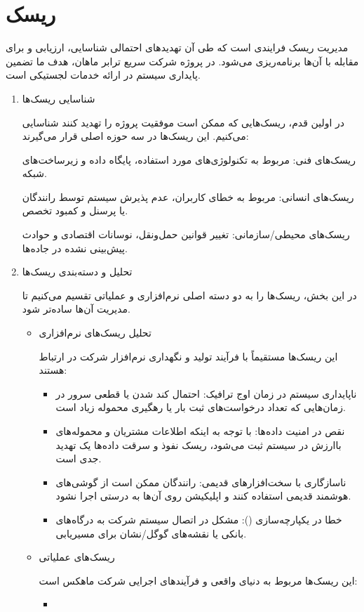 \documentclass[12pt,a4paper]{report}
\begin{document}
\chapter{ریسک}
مدیریت ریسک فرایندی است که طی آن تهدیدهای احتمالی شناسایی، ارزیابی و برای مقابله با آن‌ها برنامه‌ریزی می‌شود. در پروژه شرکت سریع ترابر ماهان، هدف ما تضمین پایداری سیستم در ارائه خدمات لجستیکی است.
\begin{enumerate}
	\item 
 شناسایی ریسک‌ها 
 
در اولین قدم، ریسک‌هایی که ممکن است موفقیت پروژه را تهدید کنند شناسایی می‌کنیم. این ریسک‌ها در سه حوزه اصلی قرار می‌گیرند:

ریسک‌های فنی: مربوط به تکنولوژی‌های مورد استفاده، پایگاه داده و زیرساخت‌های شبکه.

ریسک‌های انسانی: مربوط به خطای کاربران، عدم پذیرش سیستم توسط رانندگان یا پرسنل و کمبود تخصص.

ریسک‌های محیطی/سازمانی: تغییر قوانین حمل‌ونقل، نوسانات اقتصادی و حوادث پیش‌بینی نشده در جاده‌ها.
\item 
 تحلیل و دسته‌بندی ریسک‌ها
 
در این بخش، ریسک‌ها را به دو دسته اصلی نرم‌افزاری و عملیاتی تقسیم می‌کنیم تا مدیریت آن‌ها ساده‌تر شود.
\begin{itemize}
	\item 
تحلیل ریسک‌های نرم‌افزاری

این ریسک‌ها مستقیماً با فرآیند تولید و نگهداری نرم‌افزار شرکت در ارتباط هستند:
\begin{itemize}
	\item 
ناپایداری سیستم در زمان اوج ترافیک: احتمال کند شدن یا قطعی سرور در زمان‌هایی که تعداد درخواست‌های ثبت بار یا رهگیری محموله زیاد است.
\item 
نقص در امنیت داده‌ها: با توجه به اینکه اطلاعات مشتریان و محموله‌های باارزش در سیستم ثبت می‌شود، ریسک نفوذ و سرقت داده‌ها یک تهدید جدی است.
\item 
ناسازگاری با سخت‌افزارهای قدیمی: رانندگان ممکن است از گوشی‌های هوشمند قدیمی استفاده کنند و اپلیکیشن روی آن‌ها به درستی اجرا نشود.
\item
خطا در یکپارچه‌سازی (): مشکل در اتصال سیستم شرکت به درگاه‌های بانکی یا نقشه‌های گوگل/نشان برای مسیریابی.
\end{itemize}
\item 
ریسک‌های عملیاتی

این ریسک‌ها مربوط به دنیای واقعی و فرآیندهای اجرایی شرکت ماهکس است:
\begin{itemize}
	\item 


\end{itemize}
\end{itemize}
\end{enumerate}
\end{document}
